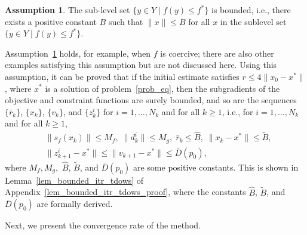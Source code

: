 \documentclass{article}
\newcommand{\colr}[1]{\textcolor{red}{#1}} %
\theoremstyle{plain}
\theoremstyle{definition}
\newtheorem{assumption}[theorem]{Assumption}
\theoremstyle{remark}
\begin{document}
\begin{assumption}\label{asum_sublevel}
     The sub-level set $\{y \in Y \mid f(y) \leq f^*\}$ is bounded, i.e., there exists a positive constant $B$ such that $\|x\| \leq B$ for all $x$ in the sublevel set $\{y \in Y \mid f(y) \leq f^*\}$.
\end{assumption}
%
%
Assumption~\ref{asum_sublevel} holds, for example, when $f$ is coercive; there are also other examples satisfying this assumption but are not discussed here. Using this assumption, it can be proved that if the initial estimate satisfies $r \leq 4 \|x_0 - x^*\|$, where $x^*$ is a solution of problem~\eqref{prob_eq}, then the subgradients of the objective and constraint functions are surely bounded, and so are the sequences $\{\bar r_k\}$, $\{x_k\}$, $\{v_k\}$, and $\{z_k^i\}$ for $i = 1, \ldots, N_k$ and for all $k \geq 1$, i.e., 
for $i = 1, \ldots, N_k$ and for all $k\ge1$, %
\begin{align*}
    &\|s_f(x_k)\| \leq M_f, \; \|d_k^i\| \leq M_g , \; \bar r_k \leq \widehat B, \; \|x_k-x^*\| \leq \widetilde B,\\
    &\|z_{k+1}^i - x^*\| \leq \|v_{k+1} - x^*\| \leq \bar D(p_0) ,
\end{align*}
where $M_f, M_g,$ $\widehat B$, $\widetilde B$, and $\bar D(p_0)$ are some positive constants. This is shown in Lemma~\ref{lem_bounded_itr_tdows} of Appendix~\ref{lem_bounded_itr_tdows_proof}, where the constants $\widehat B$, $\widetilde B$, and $\bar D(p_0)$ are formally derived.





Next, we present the convergence rate of the method.
\end{document}
